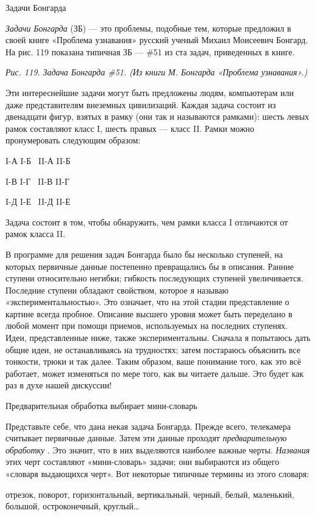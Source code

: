 \documentclass[../main.tex]{subfiles}
\begin{document}
Задачи Бонгарда

\emph{Задачи Бонгарда} (ЗБ) --- это проблемы, подобные тем, которые предложил в своей книге «Проблема узнавания» русский ученый Михаил Моисеевич Бонгард. На рис. 119 показана типичная ЗБ --- \#51 из ста задач, приведенных в книге.

\emph{Рис. 119. Задача Бонгарда \#51. (Из книги М. Бонгарда «Проблема узнавания».)}

Эти интереснейшие задачи могут быть предложены людям, компьютерам или даже представителям внеземных цивилизаций. Каждая задача состоит из двенадцати фигур, взятых в рамку (они так и называются рамками): шесть левых рамок составляют класс I, шесть правых --- класс II. Рамки можно пронумеровать следующим образом:

I-А I-Б~ II-А II-Б

I-В I-Г~ II-В II-Г

I-Д I-Е~ II-Д II-Е

Задача состоит в том, чтобы обнаружить, чем рамки класса I отличаются от рамок класса II.

В программе для решения задач Бонгарда было бы несколько ступеней, на которых первичные данные постепенно превращались бы в описания. Ранние ступени относительно негибки; гибкость последующих ступеней увеличивается. Последние ступени обладают свойством, которое я называю «экспериментальностью». Это означает, что на этой стадии представление о картине всегда пробное. Описание высшего уровня может быть переделано в любой момент при помощи приемов, используемых на последних ступенях. Идеи, представленные ниже, также экспериментальны. Сначала я попытаюсь дать общие идеи, не останавливаясь на трудностях; затем постараюсь объяснить все тонкости, трюки и так далее. Таким образом, ваше понимание того, как это всё работает, может изменяться по мере того, как вы читаете дальше. Это будет как раз в духе нашей дискуссии!

Предварительная обработка выбирает мини-словарь

Представьте себе, что дана некая задача Бонгарда. Прежде всего, телекамера считывает первичные данные. Затем эти данные проходят \emph{предварительную обработку} . Это значит, что в них выделяются наиболее важные черты. \emph{Названия} этих черт составляют «мини-словарь» задачи; они выбираются из общего «словаря выдающихся черт». Вот некоторые типичные термины из этого словаря:

отрезок, поворот, горизонтальный, вертикальный, черный, белый, маленький, большой, остроконечный, круглый\ldots{}
\end{document}
